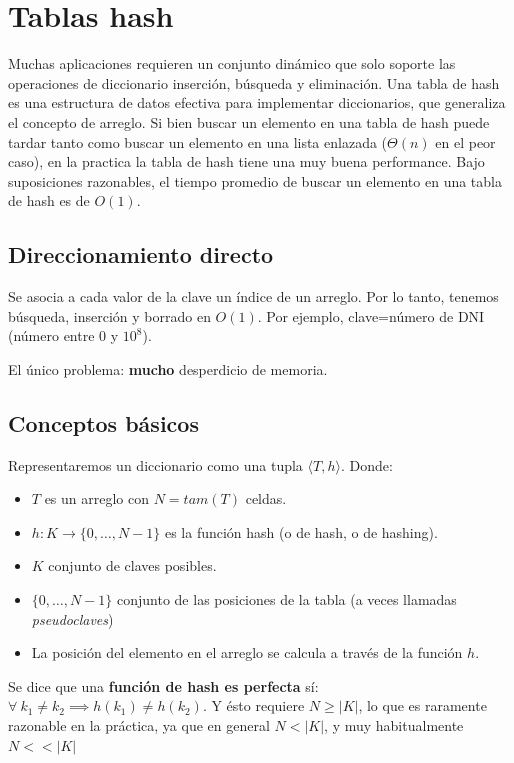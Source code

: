 \newpage
\section{Tablas hash}

Muchas aplicaciones requieren un conjunto din\'amico que solo soporte las operaciones de diccionario inserci\'on, b\'usqueda y eliminaci\'on. Una tabla de hash es una estructura de datos efectiva para implementar diccionarios, que generaliza el concepto de arreglo. Si bien buscar un elemento en una tabla de hash puede tardar tanto como buscar un elemento en una lista enlazada ($\Theta(n)$ en el peor caso), en la practica la tabla de hash tiene una muy buena performance. Bajo suposiciones razonables, el tiempo promedio de buscar un elemento en una tabla de hash es de $O(1)$.

\subsection{Direccionamiento directo}
Se asocia a cada valor de la clave un \'indice de un arreglo. Por lo tanto, tenemos b\'usqueda, inserci\'on y borrado en $O(1)$. Por ejemplo, clave=n\'umero de DNI (n\'umero entre 0 y $10^8$).

El \'unico problema: \textbf{mucho} desperdicio de memoria.

\subsection{Conceptos b\'asicos}
Representaremos un diccionario como una tupla $\langle T,h \rangle$. Donde:
\begin{itemize}
 \item $T$ es un arreglo con $N=tam(T)$ celdas.
 \item $h: K \rightarrow\{0,\dots,N-1\}$ es la funci\'on hash (o de hash, o de hashing).
 \item $K$ conjunto de claves posibles.
 \item $\{0,\dots,N-1\}$ conjunto de las posiciones de la tabla (a veces llamadas \textit{pseudoclaves})
 \item La posici\'on del elemento en el arreglo se calcula a trav\'es de la funci\'on $h$.
\end{itemize}


Se dice que una \textbf{funci\'on de hash es perfecta} s\'i: $\forall\ k_1 \neq k_2 \implies h(k_1) \neq h(k_2)$. Y \'esto requiere $N \geq |K|$, lo que es raramente razonable en la pr\'actica, ya que en general $N < |K|$, y muy habitualmente $N < < |K|$

